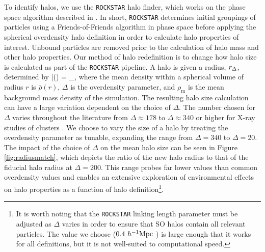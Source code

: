 \documentclass[usenatbib,fleqn]{mnras}
\begin{document}
To identify halos, we use the {\tt ROCKSTAR} halo finder, which works on the phase space algorithm described in
\citet*{behroozi_etal13a}. In short, {\tt ROCKSTAR} determines initial groupings of particles using a Friends-of-Friends algorithm in phase space before applying the spherical overdensity halo definition in order to calculate halo properties of interest. Unbound particles are removed prior to the calculation of halo mass and other halo properties. Our method of halo redefinition is to change how halo size is calculated as part of the {\tt ROCKSTAR} pipeline. A halo is given a radius, $r_{\Delta}$, determined by
\beq
	\bar{\rho}(\Rdel) = \Delta \rho_{}, 
\eeq
where the mean density within a spherical volume of radius $r$ is $\bar{\rho}(r)$, $\Delta$ is the overdensity
parameter, and $\rho_{\mathrm{m}}$ is the mean background mass density of the simulation. The resulting
halo size calculation can have a large variation dependent on the choice of $\Delta$. The number chosen for
$\Delta$ varies throughout the literature from $\Delta \approx 178$ to $\Delta \approx 340$ or higher for X-ray studies of clusters . We choose to vary the size of a halo by treating the overdensity parameter as tunable, expanding the range from $\Delta = 340$ to $\Delta = 20$. The impact of the choice of $\Delta$ on the mean halo size can be seen in Figure \ref{fig:radiusmatch}, which depicts the ratio of the new halo radius to that of the fiducial halo radius at $\Delta = 200$. This range probes far lower values than common overdensity values and enables an extensive exploration of environmental effects on halo properties as a function of halo definition\footnote{It is worth noting that the {\tt ROCKSTAR} linking length parameter must be adjusted as $\Delta$ varies in order to ensure that SO halos contain all relevant particles. The value we choose ($0.4 \ h^{-1}\mathrm{Mpc}~$) is large enough that it works for all definitions, but it is not well-suited to computational speed. }.
\end{document}
